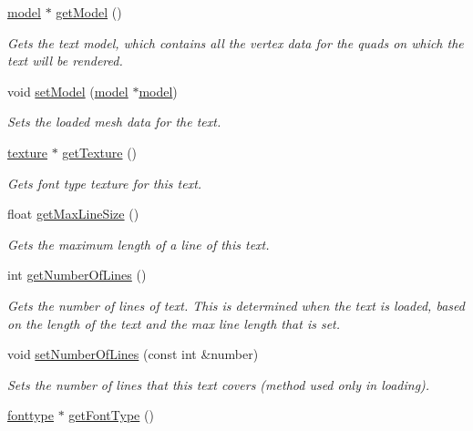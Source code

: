 \begin{DoxyCompactItemize}
\hyperlink{classflounder_1_1model}{model} $\ast$ \hyperlink{classflounder_1_1text_a38c9b07991dd35da42e571500a8b442a}{get\+Model} ()
\begin{DoxyCompactList}\small\item\em Gets the text model, which contains all the vertex data for the quads on which the text will be rendered. \end{DoxyCompactList}\item 
void \hyperlink{classflounder_1_1text_afbc27a3e51da717f111d980883afe178}{set\+Model} (\hyperlink{classflounder_1_1model}{model} $\ast$\hyperlink{classflounder_1_1model}{model})
\begin{DoxyCompactList}\small\item\em Sets the loaded mesh data for the text. \end{DoxyCompactList}\item 
\hyperlink{classflounder_1_1texture}{texture} $\ast$ \hyperlink{classflounder_1_1text_a9bb772e20f65be7cab18a52ba995af76}{get\+Texture} ()
\begin{DoxyCompactList}\small\item\em Gets font type texture for this text. \end{DoxyCompactList}\item 
float \hyperlink{classflounder_1_1text_a4135aa153773c627b6b83a34b1f2ee1f}{get\+Max\+Line\+Size} ()
\begin{DoxyCompactList}\small\item\em Gets the maximum length of a line of this text. \end{DoxyCompactList}\item 
int \hyperlink{classflounder_1_1text_a19354c6e61de672476d09163291b9346}{get\+Number\+Of\+Lines} ()
\begin{DoxyCompactList}\small\item\em Gets the number of lines of text. This is determined when the text is loaded, based on the length of the text and the max line length that is set. \end{DoxyCompactList}\item 
void \hyperlink{classflounder_1_1text_a5c4722b49473fb68783d921dd50fa329}{set\+Number\+Of\+Lines} (const int \&number)
\begin{DoxyCompactList}\small\item\em Sets the number of lines that this text covers (method used only in loading). \end{DoxyCompactList}\item 
\hyperlink{classflounder_1_1fonttype}{fonttype} $\ast$ \hyperlink{classflounder_1_1text_aeed1638cf36d796822e56370a9f6278b}{get\+Font\+Type} ()

\end{DoxyCompactItemize}
